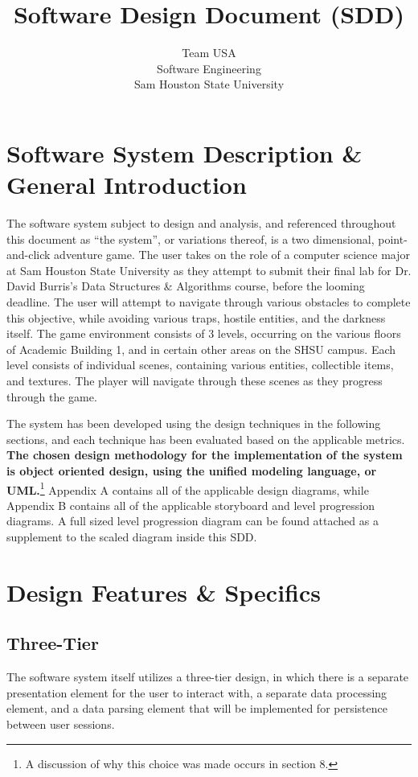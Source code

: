 \documentclass{article}
\title{Software Design Document (SDD)}
\author{Team USA \\ Software Engineering \\ Sam Houston State University}
\begin{document}
%
%
\maketitle
\newpage
%
%
\tableofcontents
\newpage
%
%
%
\section{Software System Description \& General Introduction}
The software system subject to design and analysis, and referenced throughout this document as ``the system'', or variations thereof, is a two dimensional, point-and-click adventure game. The user takes on the role of a computer science major at Sam Houston State University as they attempt to submit their final lab for Dr. David Burris's Data Structures \& Algorithms course, before the looming deadline. The user will attempt to navigate through various obstacles to complete this objective, while avoiding various traps, hostile entities, and the darkness itself. The game environment consists of 3 levels, occurring on the various floors of Academic Building 1, and in certain other areas on the SHSU campus. Each level consists of individual scenes, containing various entities, collectible items, and textures. The player will navigate through these scenes as they progress through the game. 

The system has been developed using the design techniques in the following sections, and each technique has been evaluated based on the applicable metrics. \textbf{The chosen design methodology for the implementation of the system is object oriented design, using the unified modeling language, or UML.}\footnote{A discussion of why this choice was made occurs in section 8.} Appendix A contains all of the applicable design diagrams, while Appendix B contains all of the applicable storyboard and level progression diagrams. A full sized level progression diagram can be found attached as a supplement to the scaled diagram inside this SDD. 
%
%
\section{Design Features \& Specifics} 

	\subsection{Three-Tier}
		The software system itself utilizes a three-tier design, in which there is a separate presentation element for the user to interact with, a separate data processing element, and a data parsing element that will be implemented for persistence between user sessions. 
\end{document}
